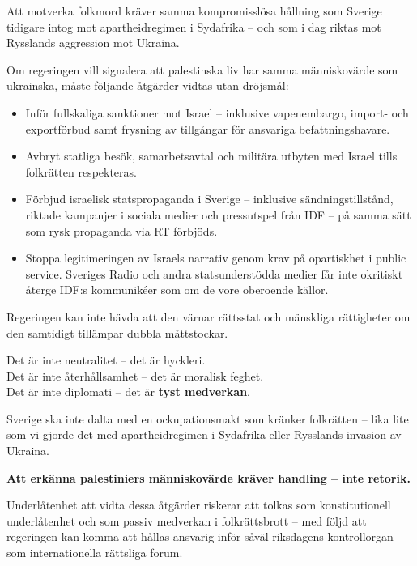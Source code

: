 Att motverka folkmord kräver samma kompromisslösa hållning som Sverige tidigare intog mot apartheidregimen i Sydafrika – och som i dag riktas mot Rysslands aggression mot Ukraina.

Om regeringen vill signalera att palestinska liv har samma människovärde som ukrainska, måste följande åtgärder vidtas utan dröjsmål:

\begin{itemize}
  \item Inför fullskaliga sanktioner mot Israel – inklusive vapenembargo, import- och exportförbud samt frysning av tillgångar för ansvariga befattningshavare.
  \item Avbryt statliga besök, samarbetsavtal och militära utbyten med Israel tills folkrätten respekteras.
  \item Förbjud israelisk statspropaganda i Sverige – inklusive sändningstillstånd, riktade kampanjer i sociala medier och pressutspel från IDF – på samma sätt som rysk propaganda via RT förbjöds.
  \item Stoppa legitimeringen av Israels narrativ genom krav på opartiskhet i public service. Sveriges Radio och andra statsunderstödda medier får inte okritiskt återge IDF:s kommunikéer som om de vore oberoende källor.
\end{itemize}

Regeringen kan inte hävda att den värnar rättsstat och mänskliga rättigheter om den samtidigt tillämpar dubbla måttstockar.

Det är inte neutralitet – det är hyckleri.\\
Det är inte återhållsamhet – det är moralisk feghet.\\
Det är inte diplomati – det är \textbf{tyst medverkan}.

Sverige ska inte dalta med en ockupationsmakt som kränker folkrätten – lika lite som vi gjorde det med apartheidregimen i Sydafrika eller Rysslands invasion av Ukraina.

\textbf{Att erkänna palestiniers människovärde kräver handling – inte retorik.}


Underlåtenhet att vidta dessa åtgärder riskerar att tolkas som konstitutionell underlåtenhet och som passiv medverkan i folkrättsbrott – med följd att regeringen kan komma att hållas ansvarig inför såväl riksdagens kontrollorgan som internationella rättsliga forum.

